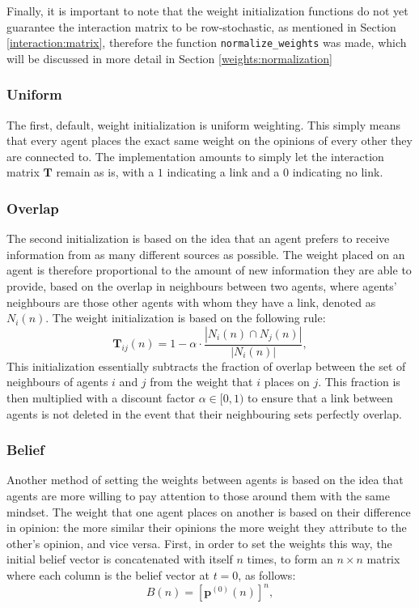\documentclass[a4paper, 12pt]{report}
\newcommand{\T}{\bm{T}}
\begin{document}
\noindent Finally, it is important to note that the weight initialization functions do not yet guarantee the interaction matrix to be row-stochastic, as mentioned in Section \ref{interaction:matrix}, therefore the function \texttt{normalize\_weights} was made, which will be discussed in more detail in Section \ref{weights:normalization}

\subsubsection{Uniform}

The first, default, weight initialization is uniform weighting. This simply means that every agent places the exact same weight on the opinions of every other they are connected to. The implementation amounts to simply let the interaction matrix $\T$ remain as is, with a $1$ indicating a link and a $0$ indicating no link.

\subsubsection{Overlap}

The second initialization is based on the idea that an agent prefers to receive information from as many different sources as possible. The weight placed on an agent is therefore proportional to the amount of new information they are able to provide, based on the overlap in neighbours between two agents, where agents' neighbours are those other agents with whom they have a link, denoted as $N_i(n)$. The weight initialization is based on the following rule:
\begin{equation*}
    \T_{ij}(n) = 1 - \alpha \cdot \frac{|N_i(n) \cap N_j(n)|}{|N_i(n)|},
\end{equation*}
This initialization essentially subtracts the fraction of overlap between the set of neighbours of agents $i$ and $j$ from the weight that $i$ places on $j$. This fraction is then multiplied with a discount factor $\alpha \in [0, 1)$ to ensure that a link between agents is not deleted in the event that their neighbouring sets perfectly overlap. 

\subsubsection{Belief}

Another method of setting the weights between agents is based on the idea that agents are more willing to pay attention to those around them with the same mindset. The weight that one agent places on another is based on their difference in opinion: the more similar their opinions the more weight they attribute to the other's opinion, and vice versa. First, in order to set the weights this way, the initial belief vector is concatenated with itself $n$ times, to form an $n \times n$ matrix where each column is the belief vector at $t=0$, as follows:
\begin{equation*}
    B(n) = [\bm{p}^{(0)}(n)]^{n},
\end{equation*}
\end{document}
